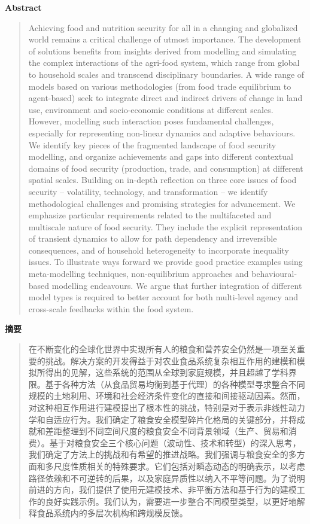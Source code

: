 \vspace{1.5em}
\noindent\textbf{Abstract}\par
\begin{quote}\small
Achieving food and nutrition security for all in a changing and globalized world remains a critical challenge of utmost importance. The development of solutions benefits from insights derived from modelling and simulating the complex interactions of the agri-food system, which range from global to household scales and transcend disciplinary boundaries. A wide range of models based on various methodologies (from food trade equilibrium to agent-based) seek to integrate direct and indirect drivers of change in land use, environment and socio-economic conditions at different scales. However, modelling such interaction poses fundamental challenges, especially for representing non-linear dynamics and adaptive behaviours. We identify key pieces of the fragmented landscape of food security modelling, and organize achievements and gaps into different contextual domains of food security (production, trade, and consumption) at different spatial scales. Building on in-depth reflection on three core issues of food security -- volatility, technology, and transformation -- we identify methodological challenges and promising strategies for advancement. We emphasize particular requirements related to the multifaceted and multiscale nature of food security. They include the explicit representation of transient dynamics to allow for path dependency and irreversible consequences, and of household heterogeneity to incorporate inequality issues. To illustrate ways forward we provide good practice examples using meta-modelling techniques, non-equilibrium approaches and behavioural-based modelling endeavours. We argue that further integration of different model types is required to better account for both multi-level agency and cross-scale feedbacks within the food system.
\end{quote}

\noindent\textbf{摘要}\par
\begin{quote}\small
在不断变化的全球化世界中实现所有人的粮食和营养安全仍然是一项至关重要的挑战。解决方案的开发得益于对农业食品系统复杂相互作用的建模和模拟所得出的见解，这些系统的范围从全球到家庭规模，并且超越了学科界限。基于各种方法（从食品贸易均衡到基于代理）的各种模型寻求整合不同规模的土地利用、环境和社会经济条件变化的直接和间接驱动因素。然而，对这种相互作用进行建模提出了根本性的挑战，特别是对于表示非线性动力学和自适应行为。我们确定了粮食安全模型碎片化格局的关键部分，并将成就和差距整理到不同空间尺度的粮食安全不同背景领域（生产、贸易和消费）。基于对粮食安全三个核心问题（波动性、技术和转型）的深入思考，我们确定了方法上的挑战和有希望的推进战略。我们强调与粮食安全的多方面和多尺度性质相关的特殊要求。它们包括对瞬态动态的明确表示，以考虑路径依赖和不可逆转的后果，以及家庭异质性以纳入不平等问题。为了说明前进的方向，我们提供了使用元建模技术、非平衡方法和基于行为的建模工作的良好实践示例。我们认为，需要进一步整合不同模型类型，以更好地解释食品系统内的多层次机构和跨规模反馈。
\end{quote}

